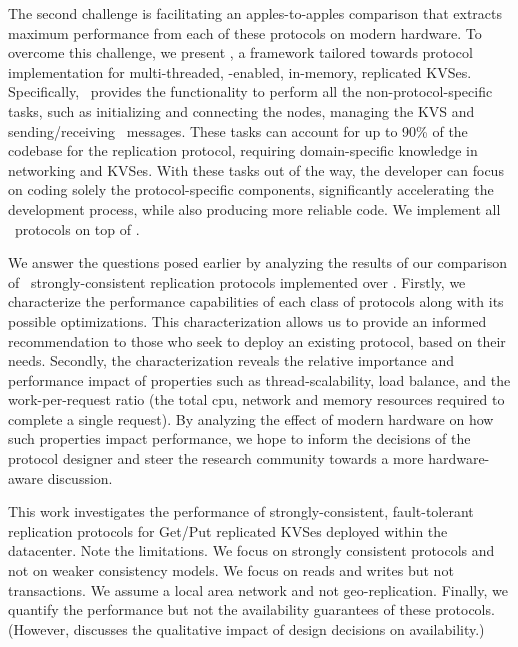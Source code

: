 The second challenge is facilitating 
an apples-to-apples comparison that extracts maximum performance from each of these protocols on modern hardware. 
To overcome this challenge, 
we present \odlib, a framework tailored towards protocol implementation for multi-threaded, \RDMA-enabled, in-memory, replicated KVSes. 
Specifically, \odlib\ provides the functionality to perform all the non-protocol-specific tasks, such as initializing and connecting the nodes, managing the KVS and sending/receiving \RDMA\ messages.
These tasks can account for up to 90\% of the codebase for the replication protocol, requiring domain-specific knowledge in networking and KVSes. With these tasks out of the way, the developer can focus on coding solely the protocol-specific components, significantly accelerating the development process, while also producing more reliable code. We implement all \pnum~protocols on top of \odlib. 



We answer the questions posed earlier by analyzing the results of our
comparison of \pnum\ strongly-consistent replication protocols implemented over \odlib.
Firstly, we characterize
the performance capabilities of each class of protocols along with its possible optimizations. 
This characterization allows us to provide an informed recommendation to those who seek to deploy an existing protocol, based on their needs.
Secondly, the characterization reveals the relative importance and performance impact of properties such as thread-scalability, load balance, and the work-per-request ratio (\ie  the total cpu, network and memory resources required to complete a single request).
By analyzing the effect of modern hardware on how such properties impact performance, we hope to inform the decisions of the protocol designer and steer the research community towards a more hardware-aware discussion.



This work investigates the performance of strongly-consistent, fault-tolerant replication protocols for Get/Put replicated KVSes deployed within the datacenter. Note the limitations. We focus on strongly consistent protocols and not on weaker consistency models. We focus on reads and writes but not transactions. We assume a local area network and not geo-replication. Finally, we quantify the performance but not the availability guarantees of these protocols. (However,  discusses the qualitative impact of design decisions on availability.)


